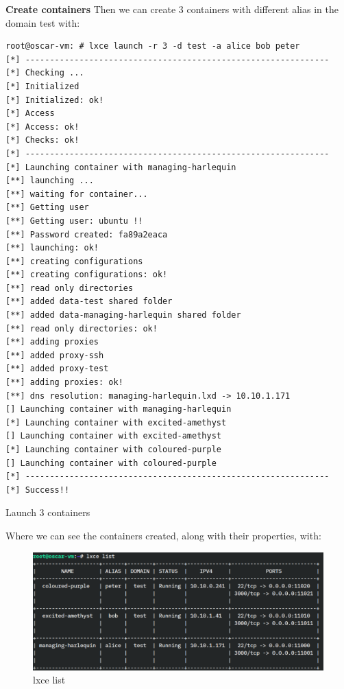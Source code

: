 \newpage
\textbf{Create containers}
Then we can create 3 containers with different alias in the domain test with:
\begin{listing}[H]
\begin{verbatim}
root@oscar-vm: # lxce launch -r 3 -d test -a alice bob peter 
[*] --------------------------------------------------------------
[*] Checking ...
[*] Initialized
[*] Initialized: ok!
[*] Access
[*] Access: ok!
[*] Checks: ok!
[*] --------------------------------------------------------------
[*] Launching container with managing-harlequin
[**] launching ...
[**] waiting for container...
[**] Getting user
[**] Getting user: ubuntu !!
[**] Password created: fa89a2eaca
[**] launching: ok!
[**] creating configurations
[**] creating configurations: ok!
[**] read only directories
[**] added data-test shared folder
[**] added data-managing-harlequin shared folder
[**] read only directories: ok!
[**] adding proxies
[**] added proxy-ssh
[**] added proxy-test
[**] adding proxies: ok!
[**] dns resolution: managing-harlequin.lxd -> 10.10.1.171
[] Launching container with managing-harlequin
[*] Launching container with excited-amethyst
[] Launching container with excited-amethyst
[*] Launching container with coloured-purple
[] Launching container with coloured-purple
[*] --------------------------------------------------------------
[*] Success!!
\end{verbatim}
\caption[lxce launch]{\footnotesize{Launch 3 containers}}
\end{listing}

\newpage
Where we can see the containers created, along with their properties, with:

\begin{figure}[H]
\label{fig:lxce list}
\centering
\includegraphics[width=\textwidth]{img/04/lxce-list.pdf}
\caption[lxce list]{\footnotesize{lxce list}}
\end{figure}


